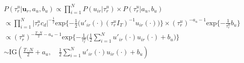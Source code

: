 \documentclass[a4paper]{article}
\begin{document}
\begin{itemize}
\begin{equation*}
\begin{aligned}
&P(\tau^{u}_r|\boldsymbol{u}_r, a_u, b_u) \propto \prod_{i = 1}^N P(u_{ir}|\tau^{u}_r) \times P(\tau^{u}_r|a_u, b_u) \\
&\propto\prod_{i = 1}^N |\tau^{u}_rc_d|^{-\frac{1}{2}}\mbox{exp}\{-\frac{1}{2}\Big(u'_{ir}(\cdot)(\tau^{u}_rI_T)^{-1}u_{ir}(\cdot)\Big)\}\times (\tau^{u}_r)^{-a_u-1}\mbox{exp}\{-\frac{1}{\tau^{u}_r}b_u\}\\
&\propto(\tau^{u}_r)^{-\frac{T \cdot N}{2}-a_u-1}\mbox{exp}\{-\frac{1}{\tau^{u}_r}\Big(\frac{1}{2}\sum_{i = 1}^N u'_{ir}(\cdot)u_{ir}(\cdot)+b_u\Big)\}\\
&\sim \mbox{IG}(\frac{T \cdot N}{2}+a_u,\quad \frac{1}{2}\sum_{i = 1}^N u'_{ir}(\cdot)u_{ir}(\cdot)+b_u)	
\end{aligned}
\end{equation*} 
\end{itemize}
\end{document}

